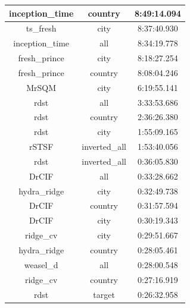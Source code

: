 \documentclass{ieeeaccess}
\begin{document}
\begin{table}[ht]
\begin{tabular}{|c|c|c|}
    inception\_time           & country           & 8:49:14.094                     \\ \hline
    ts\_fresh                 & city              & 8:37:40.930                     \\ \hline
    inception\_time           & all               & 8:34:19.778                     \\ \hline
    fresh\_prince             & city              & 8:18:27.254                     \\ \hline
    fresh\_prince             & country           & 8:08:04.246                     \\ \hline
    MrSQM                     & city              & 6:19:55.141                     \\ \hline
    rdst                      & all               & 3:33:53.686                     \\ \hline
    rdst                      & country           & 2:36:26.380                     \\ \hline
    rdst                      & city              & 1:55:09.165                     \\ \hline
    rSTSF                     & inverted\_all     & 1:53:40.056                     \\ \hline
    rdst                      & inverted\_all     & 0:36:05.830                     \\ \hline
    DrCIF                     & all               & 0:33:28.662                     \\ \hline
    hydra\_ridge              & city              & 0:32:49.738                     \\ \hline
    DrCIF                     & country           & 0:31:57.594                     \\ \hline
    DrCIF                     & city              & 0:30:19.343                     \\ \hline
    ridge\_cv                 & city              & 0:29:51.667                     \\ \hline
    hydra\_ridge              & country           & 0:28:05.461                     \\ \hline
    weasel\_d                 & all               & 0:28:00.548                     \\ \hline
    ridge\_cv                 & country           & 0:27:16.919                     \\ \hline
    rdst                      & target            & 0:26:32.958                     \\ \hline

\end{tabular}
\end{table}
\end{document}
